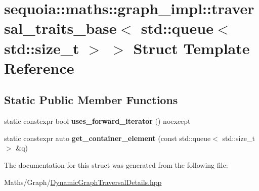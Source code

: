 \hypertarget{structsequoia_1_1maths_1_1graph__impl_1_1traversal__traits__base_3_01std_1_1queue_3_01std_1_1size__t_01_4_01_4}{}\section{sequoia\+::maths\+::graph\+\_\+impl\+::traversal\+\_\+traits\+\_\+base$<$ std\+::queue$<$ std\+::size\+\_\+t $>$ $>$ Struct Template Reference}
\label{structsequoia_1_1maths_1_1graph__impl_1_1traversal__traits__base_3_01std_1_1queue_3_01std_1_1size__t_01_4_01_4}
\subsection*{Static Public Member Functions}
\begin{DoxyCompactItemize}
\item 
\mbox{\label{structsequoia_1_1maths_1_1graph__impl_1_1traversal__traits__base_3_01std_1_1queue_3_01std_1_1size__t_01_4_01_4_a22645e9a8cff545f502ba2777b5cb17a}} 
static constexpr bool {\bfseries uses\+\_\+forward\+\_\+iterator} () noexcept
\item 
\mbox{\label{structsequoia_1_1maths_1_1graph__impl_1_1traversal__traits__base_3_01std_1_1queue_3_01std_1_1size__t_01_4_01_4_aa804ce86de1c893e322d5aa84577a389}} 
static constexpr auto {\bfseries get\+\_\+container\+\_\+element} (const std\+::queue$<$ std\+::size\+\_\+t $>$ \&q)
\end{DoxyCompactItemize}


The documentation for this struct was generated from the following file\+:\begin{DoxyCompactItemize}
\item 
Maths/\+Graph/\mbox{\hyperlink{_dynamic_graph_traversal_details_8hpp}{Dynamic\+Graph\+Traversal\+Details.\+hpp}}\end{DoxyCompactItemize}
